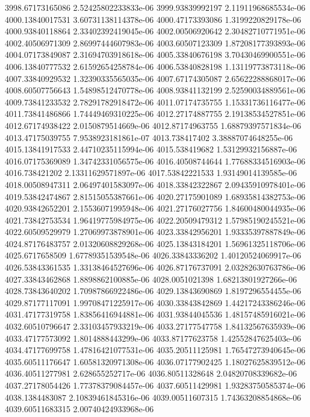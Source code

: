 {3998.67173165086 2.52425802233833e-06
3999.93839992197 2.11911968685534e-06
4000.13840017531 3.60731138114378e-06
4000.47173393086 1.3199220829178e-06
4000.93840118864 2.33402392419045e-06
4002.00506920642 2.30482710771951e-06
4002.40506971309 2.86997444607983e-06
4003.60507123309 1.87208177393893e-06
4004.07173849087 2.31694703918618e-06
4005.33840676198 3.70430469900551e-06
4006.13840777532 2.61592654258784e-06
4006.53840828198 1.13119773873118e-06
4007.33840929532 1.32390335565035e-06
4007.67174305087 2.65622288868017e-06
4008.60507756643 1.54898512470778e-06
4008.93841132199 2.52590034889561e-06
4009.73841233532 2.78291782918472e-06
4011.07174735755 1.15331736116477e-06
4011.73841486866 1.74449469310225e-06
4012.27174887755 2.19138534527851e-06
4012.67174938422 2.0150879514669e-06
4012.87174963755 1.68879397571834e-06
4013.47175039755 7.9538923181861e-07
4013.738417402 3.38887074648255e-06
4015.13841917533 2.44710235115994e-06
4015.538419682 1.53129932156887e-06
4016.07175369089 1.34742331056575e-06
4016.40508744644 1.77688334516903e-06
4016.738421202 2.13311629571897e-06
4017.53842221533 1.93149014139585e-06
4018.00508947311 2.06497401583097e-06
4018.33842322867 2.09435910978401e-06
4019.53842474867 2.81515055387661e-06
4020.27175901089 1.68935814382753e-06
4020.93842652201 2.15536071995948e-06
4021.27176027756 1.84600480044935e-06
4021.73842753534 1.96419775984975e-06
4022.20509479312 1.57985190245521e-06
4022.60509529979 1.27069973878901e-06
4023.33842956201 1.93335397887849e-06
4024.87176483757 2.01320608829268e-06
4025.13843184201 1.56961325118706e-06
4025.6717658509 1.67789351539548e-06
4026.33843336202 1.40120524069917e-06
4026.53843361535 1.33138464527696e-06
4026.87176737091 2.03282630763786e-06
4027.33843462868 1.8898862100885e-06
4028.0051021398 1.68213801927266e-06
4028.73843640202 1.70987866922486e-06
4029.13843690869 1.8197296554455e-06
4029.87177117091 1.99708471225917e-06
4030.33843842869 1.44217243386246e-06
4031.47177319758 1.83856416944881e-06
4031.93844045536 1.48157485916021e-06
4032.60510796647 2.33103457933219e-06
4033.27177547758 1.84132567635939e-06
4033.47177573092 1.8014888443299e-06
4033.87177623758 1.42552847625403e-06
4034.47177699758 1.47816421077531e-06
4035.20511125981 1.76547273940645e-06
4035.60511176647 1.60581320971308e-06
4036.07177902425 1.18027625839512e-06
4036.40511277981 2.628655252717e-06
4036.80511328648 2.04820708339682e-06
4037.27178054426 1.77378379084457e-06
4037.60511429981 1.93283750585374e-06
4038.1384483087 2.10839461845316e-06
4039.00511607315 1.74363208854868e-06
4039.60511683315 2.00740424933968e-06
}
